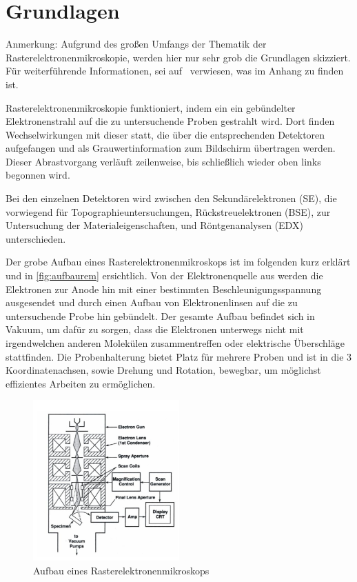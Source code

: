 \documentclass[12pt,english,ngerman]{scrartcl}
\begin{document}


\section{Grundlagen}

Anmerkung: Aufgrund des großen Umfangs der Thematik der
Rasterelektronenmikroskopie, werden hier nur sehr grob die Grundlagen
skizziert. Für weiterführende Informationen, sei
auf~\cite{zankel_vorbereitungsunterlagen_2013} verwiesen, was im Anhang zu finden ist.

Rasterelektronenmikroskopie funktioniert, indem ein ein gebündelter
Elektronenstrahl auf die zu untersuchende Proben gestrahlt wird. Dort finden
Wechselwirkungen mit dieser statt, die über die entsprechenden Detektoren
aufgefangen und als Grauwertinformation zum Bildschirm übertragen werden. Dieser
Abrastvorgang verläuft zeilenweise, bis schließlich wieder oben links begonnen
wird.

Bei den einzelnen Detektoren wird zwischen den Sekundärelektronen (SE), die
vorwiegend für Topographieuntersuchungen, Rückstreuelektronen (BSE), zur
Untersuchung der Materialeigenschaften, und Röntgenanalysen (EDX)
unterschieden.

Der grobe Aufbau eines Rasterelektronenmikroskops ist im folgenden kurz erklärt
und in \autoref{fig:aufbaurem} ersichtlich. Von der Elektronenquelle aus
werden die Elektronen zur Anode hin mit einer bestimmten
Beschleunigungsspannung ausgesendet und durch einen Aufbau von Elektronenlinsen
auf die zu untersuchende Probe hin gebündelt. Der gesamte Aufbau befindet sich
in Vakuum, um dafür zu sorgen, dass die Elektronen unterwegs nicht mit
irgendwelchen anderen Molekülen zusammentreffen oder elektrische Überschläge
stattfinden. Die Probenhalterung bietet Platz für mehrere Proben und ist in die
3 Koordinatenachsen, sowie Drehung und Rotation, bewegbar, um möglichst
effizientes Arbeiten zu ermöglichen.~\cite{zankel_vorbereitungsunterlagen_2013}

\begin{figure}[]
	\begin{center}
		\includegraphics[width =0.5\textwidth]{./figures/aufbaurem.png}
	\end{center}
	\caption[Aufbau eines Rasterelektronenmikroskops]{Aufbau eines
		Rasterelektronenmikroskops~\cite{zankel_vorbereitungsunterlagen_2013}
	}\label{fig:aufbaurem}
\end{figure}
\end{document}
